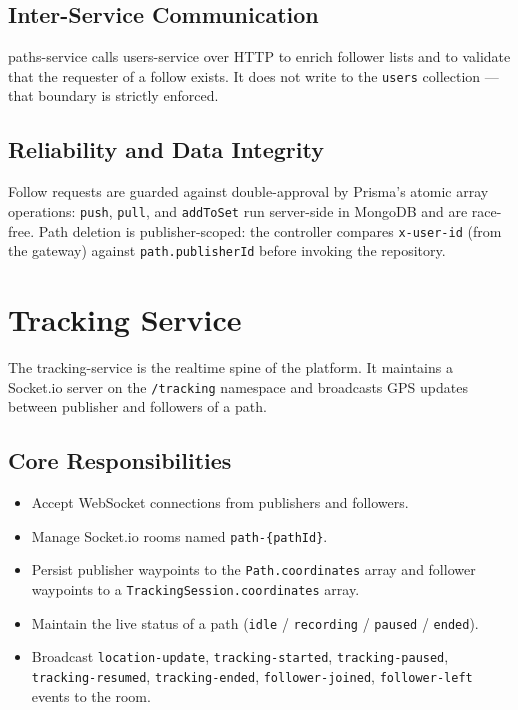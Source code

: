 \documentclass[11pt,a4paper]{article}
\begin{document}
\subsection{Inter-Service Communication}
paths-service calls users-service over HTTP to enrich follower lists
and to validate that the requester of a follow exists.  It does not
write to the \texttt{users} collection — that boundary is strictly
enforced.

\subsection{Reliability and Data Integrity}
Follow requests are guarded against double-approval by Prisma's
atomic array operations: \texttt{push}, \texttt{pull}, and
\texttt{addToSet} run server-side in MongoDB and are race-free.
Path deletion is publisher-scoped: the controller compares
\texttt{x-user-id} (from the gateway) against
\texttt{path.publisherId} before invoking the repository.

\section{Tracking Service}

The tracking-service is the realtime spine of the platform.  It
maintains a Socket.io server on the \texttt{/tracking} namespace and
broadcasts GPS updates between publisher and followers of a path.

\subsection{Core Responsibilities}
\begin{itemize}[leftmargin=*]
  \item Accept WebSocket connections from publishers and followers.
  \item Manage Socket.io rooms named \texttt{path-\{pathId\}}.
  \item Persist publisher waypoints to the \texttt{Path.coordinates}
        array and follower waypoints to a
        \texttt{TrackingSession.coordinates} array.
  \item Maintain the live status of a path
        (\texttt{idle} / \texttt{recording} / \texttt{paused} /
        \texttt{ended}).
  \item Broadcast \texttt{location-update},
        \texttt{tracking-started}, \texttt{tracking-paused},
        \texttt{tracking-resumed}, \texttt{tracking-ended},
        \texttt{follower-joined}, \texttt{follower-left} events to
        the room.
\end{itemize}
\end{document}

